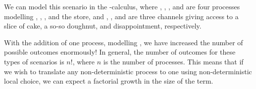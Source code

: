 \documentclass[envcountsame,envcountsect,UKenglish]{llncs}
\begin{document}
We can model this scenario in the \textpi-calculus, where \ami, \boe, \cat, and \store are four processes modelling \Ami, \Boe, \Cat, and the store, and \sliceofcake, \doughnut, and \nope are three channels giving access to a slice of cake, a so-so doughnut, and disappointment, respectively.
\begin{center}
\end{center}
With the addition of one process, modelling \Cat, we have increased the number of possible outcomes enormously! In general, the number of outcomes for these types of scenarios is $n!$, where $n$ is the number of processes. This means that if we wish to translate any non-deterministic process to one using non-deterministic local choice, we can expect a factorial growth in the size of the term.
\end{document}
